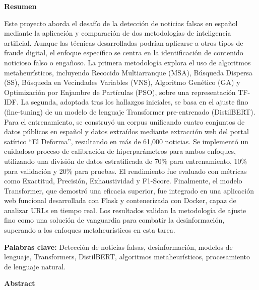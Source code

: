 \thispagestyle{plain}  
\vspace{0.9cm}
\textbf{{\Large Resumen}}
\vspace{0.9cm}

Este proyecto aborda el desafío de la detección de noticias falsas en español mediante la aplicación y comparación de dos metodologías de inteligencia artificial. Aunque las técnicas desarrolladas podrían aplicarse a otros tipos de fraude digital, el enfoque específico se centra en la identificación de contenido noticioso falso o engañoso. La primera metodología explora el uso de algoritmos metaheurísticos, incluyendo Recocido Multiarranque (MSA), Búsqueda Dispersa (SS), Búsqueda en Vecindades Variables (VNS), Algoritmo Genético (GA) y Optimización por Enjambre de Partículas (PSO), sobre una representación TF-IDF. La segunda, adoptada tras los hallazgos iniciales, se basa en el ajuste fino (fine-tuning) de un modelo de lenguaje Transformer pre-entrenado (DistilBERT). Para el entrenamiento, se construyó un corpus unificando cuatro conjuntos de datos públicos en español y datos extraídos mediante extracción web del portal satírico ``El Deforma'', resultando en más de 61,000 noticias. Se implementó un cuidadoso proceso de calibración de hiperparámetros para ambos enfoques, utilizando una división de datos estratificada de 70\% para entrenamiento, 10\% para validación y 20\% para pruebas. El rendimiento fue evaluado con métricas como Exactitud, Precisión, Exhaustividad y F1-Score. Finalmente, el modelo Transformer, que demostró una eficacia superior, fue integrado en una aplicación web funcional desarrollada con Flask y contenerizada con Docker, capaz de analizar URLs en tiempo real. Los resultados validan la metodología de ajuste fino como una solución de vanguardia para combatir la desinformación, superando a los enfoques metaheurísticos en esta tarea.

\vspace{0.9cm}
\textbf{Palabras clave:} Detección de noticias falsas, desinformación, modelos de lenguaje, Transformers, DistilBERT, algoritmos metaheurísticos, procesamiento de lenguaje natural.

\shipout\null
\newpage

\thispagestyle{plain}  
\vspace{0.9cm}
\textbf{{\Large Abstract}}
\vspace{0.9cm}

